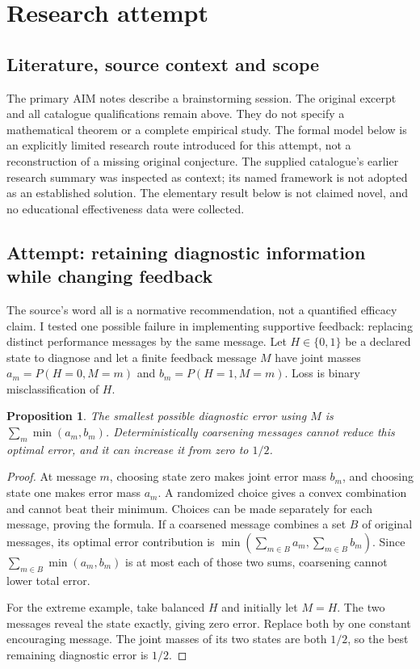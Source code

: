 \documentclass[11pt]{article}
\newtheorem{proposition}{Proposition}
\begin{document}
\section{Research attempt}
\subsection{Literature, source context and scope}
The primary AIM notes describe a brainstorming session. The original excerpt and all catalogue qualifications remain above. They do not specify a mathematical theorem or a complete empirical study. The formal model below is an explicitly limited research route introduced for this attempt, not a reconstruction of a missing original conjecture. The supplied catalogue's earlier research summary was inspected as context; its named framework is not adopted as an established solution. The elementary result below is not claimed novel, and no educational effectiveness data were collected.

\subsection{Attempt: retaining diagnostic information while changing feedback}
The source's word all is a normative recommendation, not a quantified efficacy claim. I tested one possible failure in implementing supportive feedback: replacing distinct performance messages by the same message. Let $H\in\{0,1\}$ be a declared state to diagnose and let a finite feedback message $M$ have joint masses $a_m=P(H=0,M=m)$ and $b_m=P(H=1,M=m)$. Loss is binary misclassification of $H$.
\begin{proposition}
The smallest possible diagnostic error using $M$ is $\sum_m\min(a_m,b_m)$. Deterministically coarsening messages cannot reduce this optimal error, and it can increase it from zero to $1/2$.
\end{proposition}
\begin{proof}
At message $m$, choosing state zero makes joint error mass $b_m$, and choosing state one makes error mass $a_m$. A randomized choice gives a convex combination and cannot beat their minimum. Choices can be made separately for each message, proving the formula. If a coarsened message combines a set $B$ of original messages, its optimal error contribution is $\min(\sum_{m\in B}a_m,\sum_{m\in B}b_m)$. Since $\sum_{m\in B}\min(a_m,b_m)$ is at most each of those two sums, coarsening cannot lower total error.

For the extreme example, take balanced $H$ and initially let $M=H$. The two messages reveal the state exactly, giving zero error. Replace both by one constant encouraging message. The joint masses of its two states are both $1/2$, so the best remaining diagnostic error is $1/2$.
\end{proof}
\end{document}
